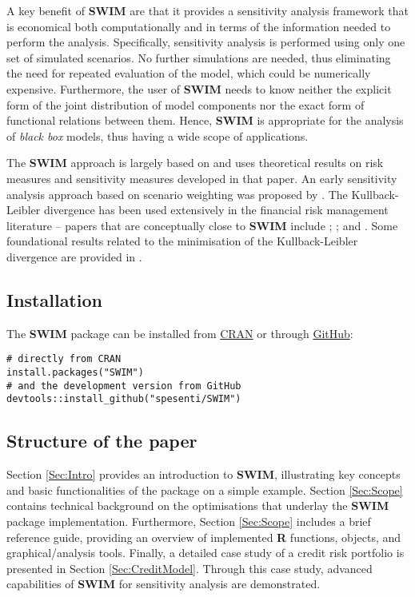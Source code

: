 \documentclass[
]{article}
\begin{document}
A key benefit of \textbf{SWIM} are that it provides a sensitivity analysis framework that is economical both computationally and in terms of the information needed to perform the analysis. Specifically, sensitivity analysis is performed using only one set of simulated scenarios. No further simulations are needed, thus eliminating the need for repeated evaluation of the model, which could be numerically expensive. Furthermore, the user of \textbf{SWIM} needs to know neither the explicit form of the joint distribution of model components nor the exact form of functional relations between them. Hence, \textbf{SWIM} is appropriate for the analysis of \emph{black box} models, thus having a wide scope of applications.

The \textbf{SWIM} approach is largely based on \citet{Pesenti2019} and uses theoretical results on risk measures and sensitivity measures developed in that paper. An early sensitivity analysis approach based on scenario weighting was proposed by \citet{Beckman1987}. The Kullback-Leibler divergence has been used extensively in the financial risk management literature -- papers that are conceptually close to \textbf{SWIM} include \citet{Weber2007}; \citet{Breuer2013}; and \citet{Cambou2017}. Some foundational results related to the minimisation of the Kullback-Leibler divergence are provided in \citet{Csiszar1975dAP}.

\hypertarget{installation}{%
\subsection{Installation}\label{installation}}

The \textbf{SWIM} package can be installed from \href{https://CRAN.R-project.org/package=SWIM}{CRAN} or through \href{https://github.com/spesenti/SWIM}{GitHub}:

\begin{verbatim}
# directly from CRAN
install.packages("SWIM")
# and the development version from GitHub 
devtools::install_github("spesenti/SWIM")
\end{verbatim}

\hypertarget{structure-of-the-paper}{%
\subsection{Structure of the paper}\label{structure-of-the-paper}}

Section \ref{Sec:Intro} provides an introduction to \textbf{SWIM}, illustrating key concepts and basic functionalities of the package on a simple example. Section
\ref{Sec:Scope} contains technical background on the optimisations that underlay the \textbf{SWIM} package implementation. Furthermore, Section \ref{Sec:Scope} includes a brief reference guide, providing an overview of implemented \textbf{R} functions, objects, and graphical/analysis tools. Finally, a detailed case study of a credit risk portfolio is presented in Section \ref{Sec:CreditModel}. Through this case study, advanced capabilities of \textbf{SWIM} for sensitivity analysis are demonstrated.
\end{document}
